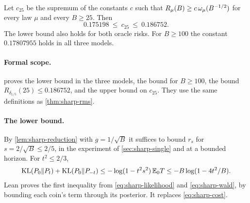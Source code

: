 \begin{theorem}\label{thm:sharp-bracket}
Let $c_{25}$ be the supremum of the constants $c$ such that
$R_\mu(B)\ge c\,\omega_\mu(B^{-1/2})$ for every law $\mu$ and every $B\ge25$.
Then
\[
 0.175198\ \le\ c_{25}\ \le\ 0.186752 .
\]
The lower bound also holds for both oracle risks. For $B\ge100$ the
constant $0.17807955$ holds in all three models.
\end{theorem}

\paragraph{Formal scope.}
 proves the lower bound in the
three models,  the bound for
$B\ge100$,  the bound
$R_{\delta_{1/5}}(25)\le0.186752$, and
 the upper bound on $c_{25}$.
They use the same definitions as \cref{thm:sharp-rms}.

\paragraph{The lower bound.}
By \cref{lem:sharp-reduction} with $g=1/\sqrt B$ it suffices to bound
$r_s$ for $s=2/\sqrt B\le2/5$, in the experiment of
\cref{sec:sharp-single} and at a bounded horizon. For $t^2\le2/3$,
\begin{equation}\label{eq:sharp-paired}
 \operatorname{KL}(P_0\Vert P_t)+\operatorname{KL}(P_0\Vert P_{-t})
 \le-\log(1-t^2s^2)\,\mathbb E_0T
 \le-B\log(1-4t^2/B).
\end{equation}
Lean proves the first inequality from \eqref{eq:sharp-likelihood} and
\eqref{eq:sharp-wald}, by bounding each coin's term through its
posterior. It replaces \eqref{eq:sharp-cost}.

